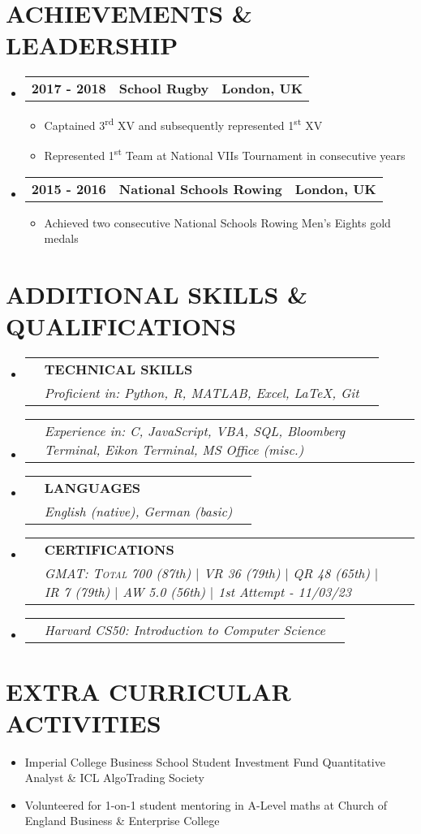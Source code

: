 \documentclass[letterpaper,10pt]{article}
\newcommand{\resumeItem}[1]{
  \item \small{#1 \vspace{-3pt}}
}
\newcommand{\achieveSubheading}[3]{
  \vspace{-2pt}\item
  \begin{tabular*}{1.0\textwidth}[t]{p{2.5cm}p{15.05cm}l}
    \textbf{\small #1} & \textbf{\small #2} & \textbf{\small #3} \\
  \end{tabular*}\vspace{-7pt}
}
\newcommand{\skillsSubheading}[6]{
  \vspace{-2pt}\item
      \begin{tabular*}{1.0\textwidth}[t]{p{2.5cm}p{17cm}l}
    \textbf{\small #1} & \textbf{\small #2} & \textbf{\small #3} \\
    \textit{\small#4} & \textit{\small #5} & \textit{\small #6} \\
  \end{tabular*}\vspace{-7pt}
}
\newcommand{\skillsSubheadingg}[3]{
  \vspace{-6pt}\item
      \begin{tabular*}{1.0\textwidth}[t]{p{2.5cm}p{17cm}l}
    \textit{\small#1} & \textit{\small #2} & \textit{\small #3} \\
  \end{tabular*}\vspace{-12pt}
}
\newcommand{\resumeSubHeadingListStart}{\begin{itemize}[leftmargin=0.0in, label={}]}
\newcommand{\resumeSubHeadingListEnd}{\end{itemize}}
\newcommand{\resumeItemListStart}{\begin{itemize}}
\newcommand{\resumeItemListEnd}{\end{itemize}\vspace{-5pt}}
\begin{document}
\section{\small ACHIEVEMENTS \& LEADERSHIP}
\vspace{5pt}
\resumeSubHeadingListStart
    \achieveSubheading{2017 - 2018}{School Rugby}{London, UK}
        \resumeItemListStart
            \resumeItem{Captained 3\textsuperscript{rd} XV and subsequently represented 1\textsuperscript{st} XV}
            \resumeItem{Represented 1\textsuperscript{st} Team at National VIIs Tournament in consecutive years}
        \resumeItemListEnd
    \achieveSubheading{2015 - 2016}{National Schools Rowing}{London, UK}
        \resumeItemListStart
                \resumeItem{Achieved two consecutive National Schools Rowing Men's Eights gold medals}
        \resumeItemListEnd
\resumeSubHeadingListEnd

        
\section{\small ADDITIONAL SKILLS \& QUALIFICATIONS}
\vspace{5pt}
\resumeSubHeadingListStart
    \skillsSubheading{}{TECHNICAL SKILLS}{}{}{Proficient in: Python, R, MATLAB, Excel, LaTeX, Git}{}
    \skillsSubheadingg{}{Experience in: C, JavaScript, VBA, SQL, Bloomberg Terminal, Eikon Terminal, MS Office (misc.)}{}
    \skillsSubheading{}{LANGUAGES}{}{}{English (native), German (basic)}{}
    \skillsSubheading{}{CERTIFICATIONS}{}{}{GMAT:{ \textsc{Total} 700 \textit{(87th)} $|$ VR 36 \textit{(79th)} $|$ QR 48 \textit{(65th)} $|$ IR 7 \textit{(79th)} $|$ AW 5.0 \textit{(56th)}} $|$ 1st Attempt - 11/03/23}{}
    \skillsSubheadingg{}{Harvard CS50: Introduction to Computer Science}{}
    
\resumeSubHeadingListEnd

\section{\small EXTRA CURRICULAR ACTIVITIES}
\vspace{5pt}
\resumeItemListStart
\resumeItem{Imperial College Business School Student Investment Fund Quantitative Analyst \& ICL AlgoTrading Society}
\vspace{-4pt}
\resumeItem{Volunteered for 1-on-1 student mentoring in A-Level maths at Church of England Business \& Enterprise College }

\resumeItemListEnd
\end{document}
